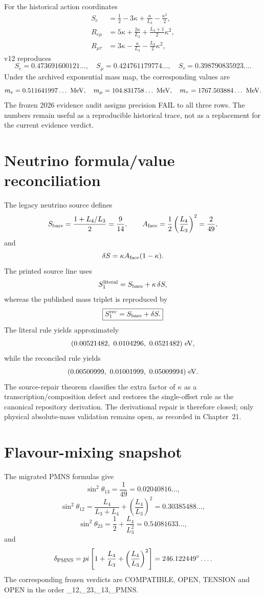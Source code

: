 \documentclass[11pt,a4paper,twoside]{book}
\def\({}%
\def\){}%
\def\pi{pi}%
\theoremstyle{definition}
\begin{document}
For the historical action coordinates
\[
\begin{aligned}
S_e&=\frac12-3\kappa+\frac{\kappa}{L_3}-\frac{\kappa^2}{2},\\
R_{e\mu}&=5\kappa+\frac{2\kappa}{L_3}
+\frac{L_3+1}{2}\kappa^2,\\
R_{\mu\tau}&=3\kappa-\frac{\kappa}{L_3}
-\frac{L_3}{2}\kappa^2,
\end{aligned}
\]
v12 reproduces
\[
S_e=0.473691600121\ldots,\quad
S_\mu=0.424761179774\ldots,\quad
S_\tau=0.398790835923\ldots .
\]
Under the archived exponential mass map, the corresponding values are
\[
m_e=0.511641997\ldots\ {\rm MeV},
\quad
m_\mu=104.831758\ldots\ {\rm MeV},
\quad
m_\tau=1767.503884\ldots\ {\rm MeV}.
\]
The frozen 2026 evidence audit assigns precision FAIL to all three rows.  The
numbers remain useful as a reproducible historical trace, not as a replacement
for the current evidence verdict.

\section{Neutrino formula/value reconciliation}

The legacy neutrino source defines
\[
S_{\rm bare}=\frac{1+L_4/L_3}{2}=\frac9{14},
\qquad
A_{\rm face}=\frac12\left(\frac{L_4}{L_3}\right)^2=\frac2{49},
\]
and
\[
\delta S=\kappa A_{\rm face}(1-\kappa).
\]
The printed source line uses
\[
S_1^{\rm literal}=S_{\rm bare}+\kappa\,\delta S,
\]
whereas the published mass triplet is reproduced by
\[
\boxed{
S_1^{\rm rec}=S_{\rm bare}+\delta S.
}
\]
The literal rule yields approximately
\[
(0.00521482,\ 0.0104296,\ 0.0521482)\ {\rm eV},
\]
while the reconciled rule yields
\[
(0.00500999,\ 0.01001999,\ 0.05009994)\ {\rm eV}.
\]
The source-repair theorem classifies the extra factor of $\kappa$ as a transcription/composition defect and restores the single-offset rule as the canonical repository derivation. The derivational repair is therefore closed; only physical absolute-mass validation remains open, as recorded in Chapter~21.

\section{Flavour-mixing snapshot}

The migrated PMNS formulas give
\[
\sin^2\theta_{13}=\frac1{49}=0.02040816\ldots,
\]
\[
\sin^2\theta_{12}
=\frac{L_4}{L_3+L_4}
+\left(\frac{L_4}{L_3}\right)^2
=0.30385488\ldots,
\]
\[
\sin^2\theta_{23}
=\frac12+\frac{L_4}{L_3^2}
=0.54081633\ldots,
\]
and
\[
\delta_{\rm PMNS}
=\pi\left[
1+\frac{L_4}{L_3}
+\left(\frac{L_4}{L_3}\right)^2
\right]
=246.122449^\circ\ldots .
\]
The corresponding frozen verdicts are COMPATIBLE, OPEN, TENSION and OPEN in the
order \(\theta_{12},\theta_{23},\theta_{13},\delta_{\rm PMNS}\).
\end{document}
